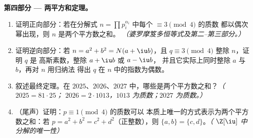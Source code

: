 \begin{problem}
\medskip
\noindent\textbf{第四部分 --- 两平方和定理。}
\begin{enumerate}[resume]
  \item 证明正向部分：若在分解式 $n =
        \prod p_i^{\alpha_i}$ 中每个 $\equiv 3 \pmod 4$ 的质数
        都以偶次幂出现，则 $n$ 是两个平方数之和。
        \emph{（婆罗摩笈多恒等式及第二--第三部分。）}
  \item 证明逆向部分：若 $n = a^2 + b^2 = N(a + \iu b)$，且
        $q \equiv 3 \pmod 4$ 整除 $n$，证明 $q$ 是
        高斯素数，整除 $a + \iu b$ 或 $a - \iu b$，
        并且它实际上同时整除 $a$ 与 $b$，再对 $n$ 用归纳法
        得出 $q$ 在 $n$ 中的指数为偶数。
  \item 叙述最终定理。在 $2025$、$2026$、$2027$
        中，哪些是两个平方数之和？\emph{（$2025 = 81 \cdot 25$；
        $2026 = 2 \cdot 1013$，$1013$ 为质数；$2027$ 为质数。）}
  \item （尾声）证明：$p \equiv 1 \pmod 4$ 的质数可以
        本质上唯一的方式表示为两个平方数之和：若 $p =
        a^2 + b^2 = c^2 + d^2$（正整数），则 $\{a, b\}
        = \{c, d\}$。\emph{（
        $\Z[\iu]$ 中分解的唯一性）}
\end{enumerate}


\end{problem}
